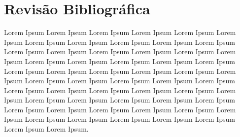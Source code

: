 \chapter{Revisão Bibliográfica}\label{revisao}



Lorem Ipsum Lorem Ipsum Lorem Ipsum Lorem Ipsum Lorem Ipsum Lorem Ipsum Lorem Ipsum Lorem Ipsum Lorem Ipsum Lorem Ipsum Lorem Ipsum Lorem Ipsum Lorem Ipsum Lorem Ipsum Lorem Ipsum Lorem Ipsum Lorem Ipsum Lorem Ipsum Lorem Ipsum Lorem Ipsum Lorem Ipsum Lorem Ipsum Lorem Ipsum Lorem Ipsum Lorem Ipsum Lorem Ipsum Lorem Ipsum Lorem Ipsum Lorem Ipsum Lorem Ipsum Lorem Ipsum Lorem Ipsum Lorem Ipsum Lorem Ipsum Lorem Ipsum Lorem Ipsum Lorem Ipsum Lorem Ipsum Lorem Ipsum Lorem Ipsum Lorem Ipsum Lorem Ipsum Lorem Ipsum Lorem Ipsum Lorem Ipsum Lorem Ipsum Lorem Ipsum Lorem Ipsum Lorem Ipsum Lorem Ipsum Lorem Ipsum Lorem Ipsum Lorem Ipsum Lorem Ipsum Lorem Ipsum Lorem Ipsum Lorem Ipsum.




